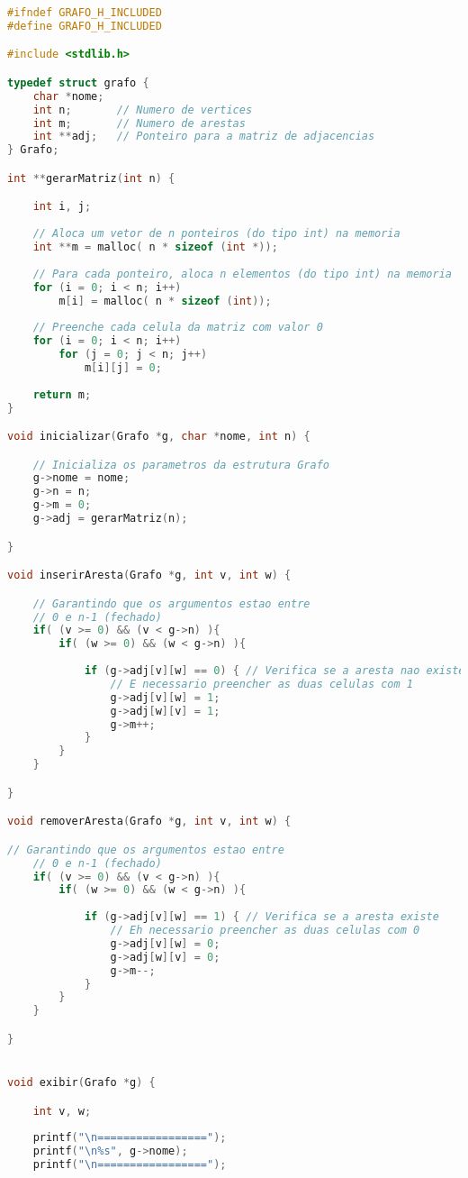 \documentclass[12pt,a4paper,oneside]{article}
\begin{document}
\begin{lstlisting}[language=C]
#ifndef GRAFO_H_INCLUDED
#define GRAFO_H_INCLUDED

#include <stdlib.h>

typedef struct grafo {
	char *nome;
	int n;       // Numero de vertices
	int m;       // Numero de arestas
	int **adj;   // Ponteiro para a matriz de adjacencias
} Grafo;

int **gerarMatriz(int n) {

	int i, j;
	
	// Aloca um vetor de n ponteiros (do tipo int) na memoria
	int **m = malloc( n * sizeof (int *));
	
	// Para cada ponteiro, aloca n elementos (do tipo int) na memoria
	for (i = 0; i < n; i++)
		m[i] = malloc( n * sizeof (int));
	
	// Preenche cada celula da matriz com valor 0
	for (i = 0; i < n; i++)
		for (j = 0; j < n; j++)
			m[i][j] = 0;
	
	return m;
}

void inicializar(Grafo *g, char *nome, int n) {

	// Inicializa os parametros da estrutura Grafo
	g->nome = nome;
	g->n = n;
	g->m = 0;
	g->adj = gerarMatriz(n);

}

void inserirAresta(Grafo *g, int v, int w) {

	// Garantindo que os argumentos estao entre
	// 0 e n-1 (fechado)
	if( (v >= 0) && (v < g->n) ){
		if( (w >= 0) && (w < g->n) ){
		
			if (g->adj[v][w] == 0) { // Verifica se a aresta nao existe
				// E necessario preencher as duas celulas com 1
				g->adj[v][w] = 1;
				g->adj[w][v] = 1;
				g->m++;
			}
		}
	}

}

void removerAresta(Grafo *g, int v, int w) {

// Garantindo que os argumentos estao entre
	// 0 e n-1 (fechado)
	if( (v >= 0) && (v < g->n) ){
		if( (w >= 0) && (w < g->n) ){
		
			if (g->adj[v][w] == 1) { // Verifica se a aresta existe
				// Eh necessario preencher as duas celulas com 0
				g->adj[v][w] = 0;
				g->adj[w][v] = 0;
				g->m--;
			}
		}
	}

}


void exibir(Grafo *g) {

	int v, w;
	
	printf("\n=================");
	printf("\n%s", g->nome);
	printf("\n=================");
	

\end{lstlisting}
\end{document}

